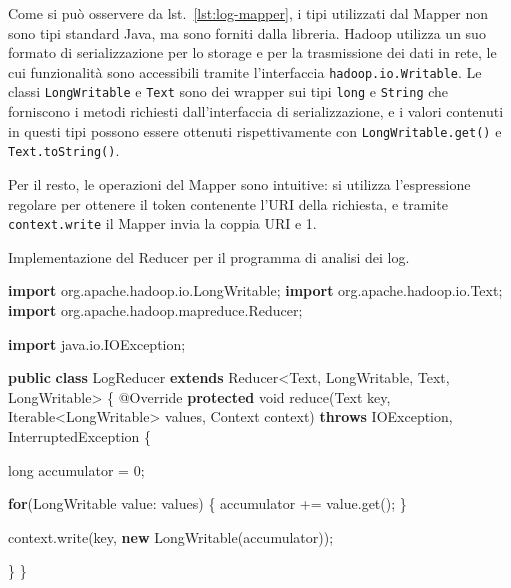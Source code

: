 \documentclass[italian,a4paper, twoside, 12pt]{report}
\newenvironment{Shaded}{}{}
\newcommand{\KeywordTok}[1]{\textcolor[rgb]{0.00,0.44,0.13}{\textbf{#1}}}
\newcommand{\DataTypeTok}[1]{\textcolor[rgb]{0.56,0.13,0.00}{#1}}
\newcommand{\DecValTok}[1]{\textcolor[rgb]{0.25,0.63,0.44}{#1}}
\newcommand{\ImportTok}[1]{#1}
\newcommand{\FunctionTok}[1]{\textcolor[rgb]{0.02,0.16,0.49}{#1}}
\newcommand{\BuiltInTok}[1]{#1}
\newcommand{\AttributeTok}[1]{\textcolor[rgb]{0.49,0.56,0.16}{#1}}
\newcommand{\NormalTok}[1]{#1}
\begin{document}
Come si può osservere da lst.~\ref{lst:log-mapper}, i tipi utilizzati
dal Mapper non sono tipi standard Java, ma sono forniti dalla libreria.
Hadoop utilizza un suo formato di serializzazione per lo storage e per
la trasmissione dei dati in rete, le cui funzionalità sono accessibili
tramite l'interfaccia \texttt{hadoop.io.Writable}. Le classi
\texttt{LongWritable} e \texttt{Text} sono dei wrapper sui tipi
\texttt{long} e \texttt{String} che forniscono i metodi richiesti
dall'interfaccia di serializzazione, e i valori contenuti in questi tipi
possono essere ottenuti rispettivamente con \texttt{LongWritable.get()}
e \texttt{Text.toString()}.

Per il resto, le operazioni del Mapper sono intuitive: si utilizza
l'espressione regolare per ottenere il token contenente l'URI della
richiesta, e tramite \texttt{context.write} il Mapper invia la coppia
URI e 1.

\begin{codelisting}

\caption{Implementazione del Reducer per il programma di analisi dei
log.}

\hypertarget{lst:log-reducer}{\label{lst:log-reducer}}
\begin{Shaded}
\begin{Highlighting}[]

\KeywordTok{import}\ImportTok{ org.apache.hadoop.io.LongWritable;}
\KeywordTok{import}\ImportTok{ org.apache.hadoop.io.Text;}
\KeywordTok{import}\ImportTok{ org.apache.hadoop.mapreduce.Reducer;}

\KeywordTok{import}\ImportTok{ java.io.IOException;}

\KeywordTok{public} \KeywordTok{class}\NormalTok{ LogReducer }\KeywordTok{extends}\NormalTok{ Reducer<}\BuiltInTok{Text}\NormalTok{, LongWritable, }\BuiltInTok{Text}\NormalTok{, LongWritable> \{}
    \AttributeTok{@Override}
    \KeywordTok{protected} \DataTypeTok{void} \FunctionTok{reduce}\NormalTok{(}\BuiltInTok{Text}\NormalTok{ key, }\BuiltInTok{Iterable}\NormalTok{<LongWritable> values, }\BuiltInTok{Context}\NormalTok{ context)}
            \KeywordTok{throws} \BuiltInTok{IOException}\NormalTok{, }\BuiltInTok{InterruptedException}\NormalTok{ \{}

        \DataTypeTok{long}\NormalTok{ accumulator = }\DecValTok{0}\NormalTok{;}

        \KeywordTok{for}\NormalTok{(LongWritable value: values) \{}
\NormalTok{            accumulator += value.}\FunctionTok{get}\NormalTok{();}
\NormalTok{        \}}

\NormalTok{        context.}\FunctionTok{write}\NormalTok{(key, }\KeywordTok{new} \FunctionTok{LongWritable}\NormalTok{(accumulator));}

\NormalTok{    \}}
\NormalTok{\}}
\end{Highlighting}
\end{Shaded}

\end{codelisting}
\end{document}
